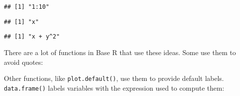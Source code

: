 \begin{Shaded}
\begin{Highlighting}[]
\StringTok{ }\NormalTok{(}
\NormalTok{(}\OperatorTok{:}\NormalTok{)}
\end{Highlighting}
\end{Shaded}

\begin{verbatim}
## [1] "1:10"
\end{verbatim}

\begin{Shaded}
\begin{Highlighting}[]
\end{Highlighting}
\end{Shaded}

\begin{verbatim}
## [1] "x"
\end{verbatim}

\begin{Shaded}
\begin{Highlighting}[]
\OperatorTok{+}\StringTok{ }\OperatorTok{^}\NormalTok{)}
\end{Highlighting}
\end{Shaded}

\begin{verbatim}
## [1] "x + y^2"
\end{verbatim}

There are a lot of functions in Base R that use these ideas. Some use
them to avoid quotes:

\begin{Shaded}
\begin{Highlighting}[]
\NormalTok{(}\NormalTok{)}
\end{Highlighting}
\end{Shaded}

Other functions, like \texttt{plot.default()}, use them to provide
default labels. \texttt{data.frame()} labels variables with the
expression used to compute them:

\begin{Shaded}
\begin{Highlighting}[]
\StringTok{ }\OperatorTok{:}
\StringTok{ }\NormalTok{letters[}\OperatorTok{:}\NormalTok{]}
\NormalTok{(}
\end{Highlighting}
\end{Shaded}

